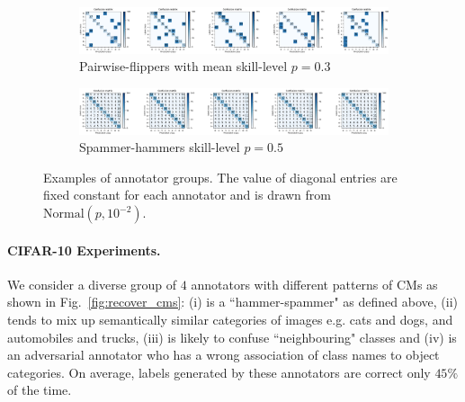 \begin{figure}[ht!]
	\center
	\begin{subfigure}[]{1.0\linewidth}
		\caption{Pairwise-flippers with mean skill-level $p=0.3$}
		\includegraphics[width=\linewidth]{chapter_4/figures/pairwise_flipper_example.png}
	\end{subfigure}
	\begin{subfigure}[]{1.0\linewidth}
		\caption{Spammer-hammers skill-level $p=0.5$}
		\includegraphics[width=\linewidth]{chapter_4/figures/hammer_spammer_example.png}
	\end{subfigure}
 	\caption{Examples of annotator groups. The value of diagonal entries are fixed constant for each annotator and is drawn from $\text{Normal}(p, 10^{-2})$.}
	\label{fig:annotator_groups}
	
\end{figure}



\paragraph{CIFAR-10 Experiments.} We consider a diverse group of $4$ annotators with different patterns of CMs as shown in Fig.~\ref{fig:recover_cms}: (i) is a ``hammer-spammer" as defined above, (ii) tends to mix up semantically similar categories of images e.g. cats and dogs, and automobiles and trucks, (iii) is likely to confuse ``neighbouring" classes and (iv) is an adversarial annotator who has a wrong association of class names to object categories. On average, labels generated by these annotators are correct only $45\%$ of the time.

